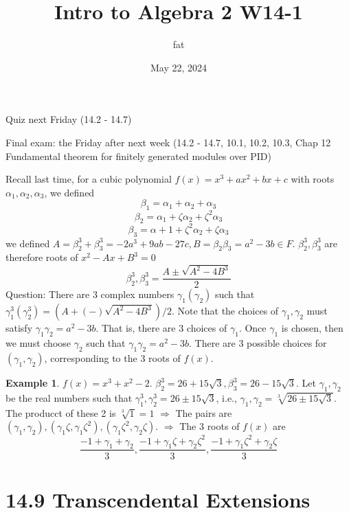 \documentclass{article}
\title{Intro to Algebra 2 W14-1}
\author{fat}
\date{May 22, 2024}
\theoremstyle{definition}
\newtheorem{ex}{Example}
\newcommand{\Ra}{\Rightarrow}
\begin{document}
\maketitle
\thispagestyle{fancy}
\renewcommand{\footrulewidth}{0.4pt}
\cfoot{\thepage}
\renewcommand{\headrulewidth}{0.4pt}

\par Quiz next Friday (14.2 - 14.7)

\par Final exam: the Friday after next week (14.2 - 14.7, 10.1, 10.2, 10.3, Chap 12 Fundamental theorem for finitely generated modules over PID)

\par Recall last time, for a cubic polynomial $f(x) = x^3 + a x^2 + bx + c$ with roots $\alpha_1, \alpha_2, \alpha_3$, we defined
\[
	\beta_1 = \alpha_1 + \alpha_2 + \alpha_3
\]
\[
	\beta_2 = \alpha_1 + \zeta \alpha_2 + \zeta^2 \alpha_3
\]
\[
	\beta_3 = \alpha+1 + \zeta^2 \alpha_2 + \zeta \alpha_3
\]
we defined $A = \beta_2^3 + \beta_3^3 = -2a^3 + 9ab - 27c, B = \beta_2 \beta_3 = a^2 - 3b\in F$.
$\beta_2^3, \beta_3^3$ are therefore roots of $x^2 - Ax + B^3 = 0$
\[
	\beta_2^3, \beta_3^3 = \frac{A \pm \sqrt{A^2 - 4 B^3}}{2}
\]
Question: There are 3 complex numbers $\gamma_1 (\gamma_2)$ such that $\gamma_1^3 (\gamma_2^3) = (A +(-) \sqrt{A^2 - 4 B^3})/2$.
Note that the choices of $\gamma_1, \gamma_2$ must satisfy $\gamma_1 \gamma_2 = a^2 - 3b$.
That is, there are 3 choices of $\gamma_1$.
Once $\gamma_1$ is chosen, then we must choose $\gamma_2$ such that $\gamma_1 \gamma_2 = a^2 - 3b$.
There are 3 possible choices for $(\gamma_1, \gamma_2)$, corresponding to the 3 roots of $f(x)$.

\begin{ex}
	$f(x) = x^3 + x^2 - 2$.
	$\beta_2^3 = 26 + 15 \sqrt{3}, \beta_3^3 = 26 - 15 \sqrt{3}$.
	Let $\gamma_1, \gamma_2$ be the real numbers such that $\gamma_1^3, \gamma_2^3 = 26 \pm 15 \sqrt{3}$, i.e., $\gamma_1, \gamma_2 = \sqrt[3]{26 \pm 15 \sqrt{3}}$.
	The producct of these 2 is $\sqrt[3]{1} = 1$
	$\Ra$ The pairs are $(\gamma_1, \gamma_2), (\gamma_1 \zeta, \gamma_1 \zeta^2), (\gamma_1 \zeta^2, \gamma_2 \zeta)$.
	$\Ra$ The 3 roots of $f(x)$ are
	\[
		\frac{-1 + \gamma_1 + \gamma_2}{3}, \frac{-1 + \gamma_1 \zeta + \gamma_2 \zeta^2}{3}, \frac{-1 + \gamma_1 \zeta^2 + \gamma_2 \zeta}{3}
	\]
\end{ex}

\section*{14.9 Transcendental Extensions}
\end{document}
